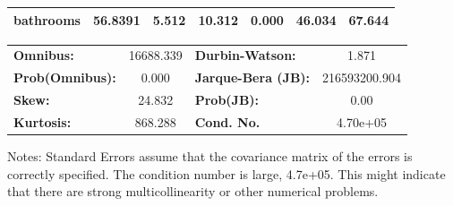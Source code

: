 \begin{center}
\begin{tabular}{lcccccc}
\textbf{bathrooms}              &      56.8391  &        5.512     &    10.312  &         0.000        &       46.034    &       67.644     \\
\bottomrule
\end{tabular}
\begin{tabular}{lclc}
\textbf{Omnibus:}       & 16688.339 & \textbf{  Durbin-Watson:     } &       1.871    \\
\textbf{Prob(Omnibus):} &    0.000  & \textbf{  Jarque-Bera (JB):  } & 216593200.904  \\
\textbf{Skew:}          &   24.832  & \textbf{  Prob(JB):          } &        0.00    \\
\textbf{Kurtosis:}      &  868.288  & \textbf{  Cond. No.          } &    4.70e+05    \\
\bottomrule
\end{tabular}
\end{center}

Notes: \newline
 [1] Standard Errors assume that the covariance matrix of the errors is correctly specified. \newline
 [2] The condition number is large, 4.7e+05. This might indicate that there are \newline
 strong multicollinearity or other numerical problems.
